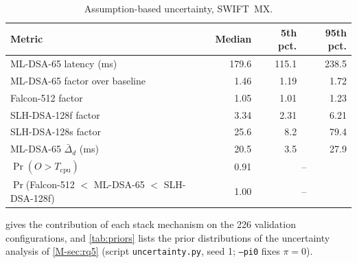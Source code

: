 \documentclass[preprint,12pt]{elsarticle}
\begin{document}
\begin{table}[!htbp]\centering\small
\caption{Assumption-based uncertainty, SWIFT~MX.}
\label{tab:uncertainty}
\begin{tabular}{@{}lrrr@{}}\toprule
Metric & Median & 5th pct. & 95th pct. \\\midrule
ML-DSA-65 latency (ms) & 179.6 & 115.1 & 238.5 \\
ML-DSA-65 factor over baseline & 1.46 & 1.19 & 1.72 \\
Falcon-512 factor & 1.05 & 1.01 & 1.23 \\
SLH-DSA-128f factor & 3.34 & 2.31 & 6.21 \\
SLH-DSA-128s factor & 25.6 & 8.2 & 79.4 \\
ML-DSA-65 $\bar{\Delta}_d$ (ms) & 20.5 & 3.5 & 27.9 \\
$\Pr(O>T_\mathrm{cpu})$ & 0.91 & \multicolumn{2}{c}{--} \\
$\Pr$(Falcon-512 $<$ ML-DSA-65 $<$ SLH-DSA-128f) & 1.00 & \multicolumn{2}{c}{--} \\
\bottomrule\end{tabular}
\end{table}

 gives the contribution of each stack mechanism on the 226 validation configurations, and \cref{tab:priors} lists the prior distributions of the uncertainty analysis of \cref{M-sec:rq5} (script \texttt{uncertainty.py}, seed 1; \texttt{--pi0} fixes $\pi=0$).

\begin{table}[!htbp]\centering\small
\caption{Contribution of each stack mechanism: excess-latency prediction error on the 226 validation configurations (model minus measurement). Nothing is fitted (\texttt{ablation\_stack.py}).}
\label{tab:ablation}
\end{table}
\end{document}
